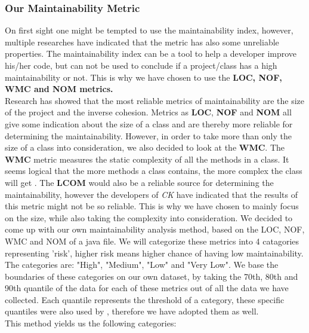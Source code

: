 \subsubsection{Our Maintainability Metric}\label{ourmaintainabilitymetric}
On first sight one might be tempted to use the maintainability index, however, multiple researches \cite{sjoberg2012questioning, heitlager2007practical} have indicated that the metric has also some unreliable properties. The maintainability index can be a tool to help a developer improve his/her code, but can not be used to conclude if a project/class has a high maintainability or not. This is why we have chosen to use the \textbf{LOC, NOF, WMC and NOM metrics.} \\ \indent
Research has showed \cite{sjoberg2012questioning} that the most reliable metrics of maintainability are the size of the project and the inverse cohesion. Metrics as \textbf{LOC}, \textbf{NOF} and \textbf{NOM} all give some indication about the size of a class and are thereby more reliable for determining the maintainability. However, in order to take more than only the size of a class into consideration, we also decided to look at the \textbf{WMC}. The \textbf{WMC} metric measures the static complexity of all the methods in a class. It seems logical that the more methods a class contains, the more complex the class will get \cite{li1993object}. The \textbf{LCOM} would also be a reliable source for determining the maintainability, however the developers of \textit{CK} have indicated that the results of this metric might not be so reliable. This is why we have chosen to mainly focus on the size, while also taking the complexity into consideration. \indent
We decided to come up with our own maintainability analysis method, based on the LOC, NOF, WMC and NOM of a java file. We will categorize these metrics into 4 catagories representing 'risk', higher risk means higher chance of having low maintainability. The categories are: "High", "Medium", "Low" and "Very Low". We base the boundaries of these categories on our own dataset, by taking the 70th, 80th and 90th quantile of the data for each of these metrics out of all the data we have collected. Each quantile represents the threshold of a category, these specific quantiles were also used by \cite{alves2010deriving}, therefore we have adopted them as well.\\This method yields us the following categories:

